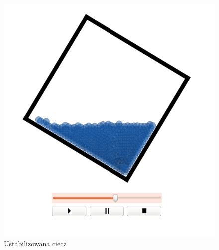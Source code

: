 \begin{minipage}{0.5\textwidth}
\begin{figure}[H]
 \begin{center} 
  \includegraphics[width=\textwidth]{./rysunki/obrot_stabilny} 
 \end{center}
 \caption{Ustabilizowana ciecz}
 \label{fig:obrot_stabilny} 
\end{figure}
\end{minipage}\\[0.1cm]


